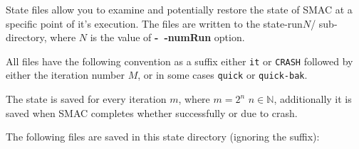 \documentclass[manual.tex]{subfiles}
\begin{document}
State files allow you to examine and potentially restore the state of SMAC at a specific point of it's execution. The files are written to the state-run$N$/ sub-directory, where $N$ is the value of \textbf{-~$\!$-numRun} option. 


All files have the following convention as a suffix either \texttt{it} or \texttt{CRASH} followed by either the iteration number $M$, or in some cases \texttt{quick} or \texttt{quick-bak}.

The state is saved for every iteration $m$, where $m=2^{n}$ $n \in \mathbb{N}$, additionally it is saved when SMAC completes whether successfully or due to crash.

The following files are saved in this state directory (ignoring the suffix):
\end{document}
